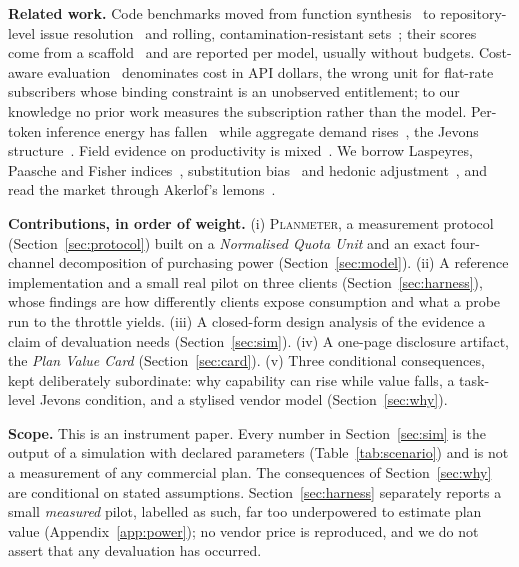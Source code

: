 \documentclass[conference]{IEEEtran}
\theoremstyle{plain}
\theoremstyle{definition}
\begin{document}
\textbf{Related work.} Code benchmarks moved from function
synthesis~\cite{chen2021humaneval,austin2021mbpp} to repository-level issue
resolution~\cite{jimenez2024swebench,openai2024swebenchverified} and rolling,
contamination-resistant sets~\cite{jain2025livecodebench}; their scores come
from a scaffold~\cite{yang2024sweagent,wang2025openhands} and are reported per
model, usually without budgets. Cost-aware evaluation~\cite{kapoor2024agents,%
chen2023frugalgpt,liang2023helm} denominates cost in API dollars, the wrong
unit for flat-rate subscribers whose binding constraint is an unobserved
entitlement; to our knowledge no prior work measures the subscription rather
than the model. Per-token inference energy has fallen~\cite{kwon2023vllm,%
leviathan2023speculative,samsi2023watts,luccioni2024powerhungry} while
aggregate demand rises~\cite{masanet2020recalibrating,iea2025energyai}, the
Jevons structure~\cite{jevons1865coal}. Field evidence on productivity is
mixed~\cite{peng2023copilot,brynjolfsson2025genai,metr2025slowdown}. We borrow
Laspeyres, Paasche and Fisher indices~\cite{fisher1922index,ilo2004cpi},
substitution bias~\cite{boskin1996toward} and hedonic
adjustment~\cite{triplett2006hedonic}, and read the market through Akerlof's
lemons~\cite{akerlof1970lemons}.

\textbf{Contributions, in order of weight.} (i) \textsc{Planmeter}, a
measurement protocol (Section~\ref{sec:protocol}) built on a \emph{Normalised
Quota Unit} and an exact four-channel decomposition of purchasing power
(Section~\ref{sec:model}). (ii) A reference implementation and a small real
pilot on three clients (Section~\ref{sec:harness}), whose findings are how
differently clients expose consumption and what a probe run to the throttle
yields. (iii) A closed-form design analysis of the evidence a claim of
devaluation needs (Section~\ref{sec:sim}). (iv) A one-page disclosure artifact,
the \emph{Plan Value Card} (Section~\ref{sec:card}). (v) Three conditional
consequences, kept deliberately subordinate: why capability can rise while
value falls, a task-level Jevons condition, and a stylised vendor model
(Section~\ref{sec:why}).

\textbf{Scope.} This is an instrument paper. Every number in
Section~\ref{sec:sim} is the output of a simulation with declared parameters
(Table~\ref{tab:scenario}) and is not a measurement of any commercial plan.
The consequences of Section~\ref{sec:why} are conditional on stated
assumptions. Section~\ref{sec:harness} separately reports a small \emph{measured} pilot,
labelled as such, far too underpowered to estimate plan value
(Appendix~\ref{app:power}); no vendor price is reproduced, and we do not assert
that any devaluation has occurred.
\end{document}
